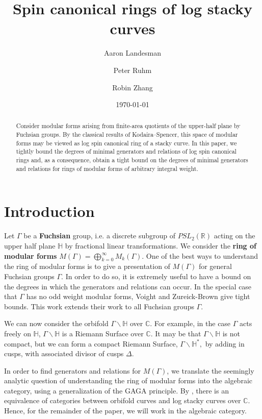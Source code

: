 \documentclass{amsart}
\title{Spin canonical rings of log stacky curves}
\author{Aaron Landesman}
\author{Peter Ruhm}
\author{Robin Zhang}
\date{\today}
\theoremstyle{plain}
\theoremstyle{definition}
\theoremstyle{remark}
\numberwithin{equation}{section}
\newcommand\BH{{\mathbb H}}
\newcommand\BC{{\mathbb C}}
\newcommand\BR{{\mathbb R}}
\begin{document}
\begin{abstract}
 	Consider modular forms arising from finite-area
	quotients of the upper-half plane by Fuchsian groups.  
	By the classical results of Kodaira--Spencer, 
	this space of modular forms may be
	viewed as log spin canonical ring of a stacky curve.
	In this paper, we tightly bound the degrees of minimal
	generators and relations of log spin canonical rings and,
	as a consequence, 
	obtain a tight bound on the degrees of minimal generators and relations  		
	for rings of modular forms of arbitrary integral weight.
\end{abstract}

\maketitle



\section{Introduction}
Let $\Gamma$ be a {\bf Fuchsian} group, i.e. a discrete subgroup of
$PSL_2(\BR)$ acting on the upper half plane $\BH$ by fractional
linear transformations. We consider the {\bf ring of modular forms}
$M(\Gamma) = \bigoplus_{k = 0}^\infty M_k(\Gamma)$. One of the best
ways to understand the ring of modular forms is to give a
presentation of $M(\Gamma)$ for general Fuchsian groups $\Gamma$. 
In order to do so, it is extremely useful to have a bound on the
degrees in which the generators and relations can occur. In the
special case that $\Gamma$ has no odd weight modular forms, Voight
and Zureick-Brown \cite[Chapters 7-9]{vzb:stacky} give tight bounds.
 This work extends their work to all Fuchsian groups $\Gamma$.

We can now consider the orbifold $\Gamma \backslash \BH$ over $\BC$.
For example, in the case $\Gamma$ acts freely on $\BH$, $\Gamma
\backslash \BH$ is a Riemann Surface over $\BC$. It may be
that $\Gamma \backslash \BH$ is not compact, but we can form a
compact Riemann Surface, $\Gamma \backslash \BH^*,$ by adding in
cusps, with associated divisor of cusps $\Delta$.

In order to find generators and relations for $M(\Gamma)$, we
translate the seemingly analytic question of understanding the ring
of modular forms into the algebraic category, using a
generalization of the GAGA principle. By \cite[Proposition 6.1.5]
{vzb:stacky}, there is an equivalence of categories between orbifold
curves and log stacky curves over $\BC$. Hence, for the remainder
of the paper, we will work in the algebraic category.
\end{document}
